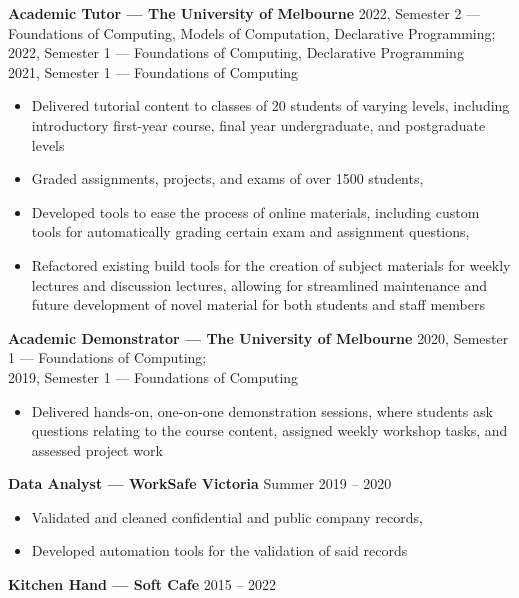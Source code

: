 \documentclass[9pt]{extarticle}
\newcommand{\entry}[3]{
    \textbf{#1} \newline
    {\footnotesize #2}
    \vspace{.05em}
    \begin{flushleft}
        #3
    \end{flushleft}
}
\begin{document}
\begin{minipage}[t]{.65\textwidth}
\entry{Academic Tutor --- The University of Melbourne}
{
    2022, Semester 2 --- Foundations of Computing, Models of Computation, Declarative Programming; \\
    2022, Semester 1 --- Foundations of Computing, Declarative Programming \\
    2021, Semester 1 --- Foundations of Computing
}
{    
    \begin{itemize}
        \item Delivered tutorial content to classes of 20 students of varying levels, 
              including introductory first-year course, final year undergraduate, and postgraduate levels 
        \item Graded assignments, projects, and exams of over 1500 students,
        \item Developed tools to ease the process of online materials, including 
              custom tools for automatically grading certain exam and assignment questions,
        \item Refactored existing build tools for the creation of subject materials for weekly lectures and 
              discussion lectures, allowing for streamlined maintenance and future development of novel material
              for both students and staff members
    \end{itemize}
}
\vspace{1.5em}

\entry{Academic Demonstrator --- The University of Melbourne}
{
    2020, Semester 1 --- Foundations of Computing; \\
    2019, Semester 1 --- Foundations of Computing
}
{
    \begin{itemize}
        \item Delivered hands-on, one-on-one demonstration sessions, where students ask questions relating 
              to the course content, assigned weekly workshop tasks, and assessed project work
    \end{itemize}
}
\vspace{1.5em}

\entry{Data Analyst --- WorkSafe Victoria}
{Summer 2019 -- 2020}
{
    \begin{itemize}
        \item Validated and cleaned confidential and public company records,
        \item Developed automation tools for the validation of said records
    \end{itemize} 
}
\vspace{1.5em}

\entry{Kitchen Hand --- Soft Cafe}
{2015 -- 2022}
{\null}

\end{minipage}
\end{document}
